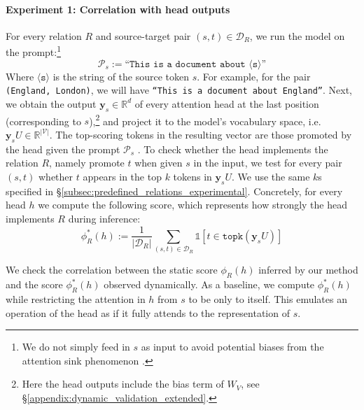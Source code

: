 \documentclass[11pt]{article}
\begin{document}
\paragraph{Experiment 1: Correlation with head outputs}
For every relation $R$ and source-target pair $(s,t) \in \mathcal{D}_R$, we run the model on the prompt:\footnote{We do not simply feed in $s$ as input to avoid potential biases from the attention sink phenomenon \cite{xiao2024efficient}.}
$$ \mathcal{P}_s := \texttt{``This is a document about $\langle$s$\rangle$''}$$
Where $\langle \texttt{s} \rangle$ is the string of the source token $s$. For example, for the pair \texttt{(England, London)}, we will have \texttt{``This is a document about England''}.
Next, we obtain the output $\mathbf{y}_s \in \mathbb{R}^d$ of every attention head at the last position (corresponding to $s$),\footnote{Here the head outputs include the bias term of $W_V$, see \S\ref{appendix:dynamic_validation_extended}.} and project it to the model's vocabulary space, i.e. $ \mathbf{y}_s U \in \mathbb{R}^{|\mathcal{V}|}$. The top-scoring tokens in the resulting vector are those promoted by the head given the prompt $\mathcal{P}_s$ \cite{geva-etal-2022-transformer}. To check whether the head implements the relation $R$, namely promote $t$ when given $s$ in the input, we test for every pair $(s,t)$ whether $t$ appears in the top $k$ tokens in $\mathbf{y}_s U$. We use the same $k$s specified in \S\ref{subsec:predefined_relations_experimental}.
Concretely, for every head $h$ we compute the following score, which represents how strongly the head implements $R$ during inference:
\begin{equation*}
\phi^*_R(h):=\frac{1}{|\mathcal{D}_R|} \sum_{(s,t)\in \mathcal{D}_R}\mathds{1}[t \in \texttt{topk}(\mathbf{y}_s U)]
\end{equation*}

We check the correlation between the static score $\phi_R(h)$ inferred by our method and the score $\phi^*_R(h)$ observed dynamically. 
As a baseline, we compute $\phi^*_R(h)$ while restricting the attention in $h$ from $s$ to be only to itself. This emulates an operation of the head as if it fully attends to the representation of $s$.
\end{document}
